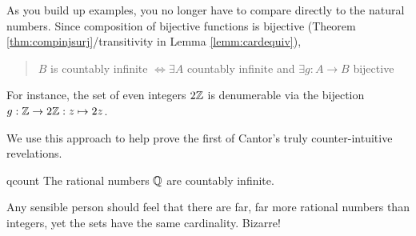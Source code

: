 % 
% 


As you build up examples, you no longer have to compare directly to the natural numbers. Since composition of bijective functions is bijective (Theorem \ref{thm:compinjsurj}/transitivity in Lemma \ref{lemm:cardequiv}),
\begin{quote}
	$B$ is countably infinite $\iff\exists A$ countably infinite and $\exists g:A\to B$ bijective
\end{quote}
For instance, the set of even integers $2\mathbb{Z}$ is denumerable via the bijection $g:\mathbb{Z}\to 2\mathbb{Z}:z\mapsto 2z$.
\medbreak

We use this approach to help prove the first of Cantor's truly counter-intuitive revelations.

\begin{thm}{}{qcount}
	The rational numbers $\mathbb{Q}$ are countably infinite.
\end{thm}


Any sensible person should feel that there are far, far more rational numbers than integers, yet the sets have the same cardinality. Bizarre!

